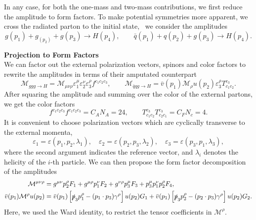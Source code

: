 In any case, for both the one-mass and two-mass contributions, we first reduce the amplitude to form factors. To make potential symmetries more apparent, we cross the radiated parton to the initial state, \ie\ we consider the amplitudes
\begin{equation}
g(p_1) + g_(p_2) + g(p_3) \longrightarrow H(p_4), \qquad \bar{q}(p_1) + q(p_2) + g(p_3) \longrightarrow H(p_4).
\end{equation}

\textbf{Projection to Form Factors}\\
We can factor out the external polarization vectors, spinors and color factors to rewrite the amplitudes in terms of their amputated counterpart
\begin{equation}
\mathcal{M}_{ggg \rightarrow H} = \mathcal{M}_{\mu \nu \rho} \varepsilon_1^\mu \varepsilon_2^\nu \varepsilon_3^\rho f^{c_1 c_2 c_3}, \qquad \mathcal{M}_{\bar{q} q g \rightarrow H} = \bar{v}(p_1) \mathcal{M}_{\rho} u(p_2) \varepsilon_3^\rho T^{c_3}_{c_1 c_2}.
\end{equation}
After squaring the amplitude and summing over the color of the external partons, we get the color factors
\begin{equation}
f^{c_1 c_2 c_3} f^{c_1 c_2 c_3} = C_A N_A = 24, \qquad T^{c_3}_{c_1 c_2} T^{c_{3}}_{c_2 c_1} = C_F N_c = 4.
\end{equation}
It is convenient to choose polarization vectors which are cyclically transverse to the external momenta, \ie\
\begin{equation}
\varepsilon_1 = \varepsilon (p_1, p_2, \lambda_1), \quad \varepsilon_2 = \varepsilon (p_2, p_3, \lambda_2), \quad \varepsilon_3 = \varepsilon (p_3, p_1, \lambda_3),
\end{equation}
where the second argument indicates the reference vector, and $\lambda_i$ denotes the helicity of the $i$-th particle. We can then propose the form factor decomposition of the amplitudes
\begin{equation}
\begin{split}
\mathcal{M}^{\mu \nu \rho} &= g^{\mu \nu} p_2^\rho F_1 + g^{\mu \rho} p_1^\nu F_2 + g^{\nu \rho} p_3^\mu F_3 + p_3^\mu p_1^\nu p_2^\rho F_4, \\
\bar{v}(p_1) \mathcal{M}^{\rho} u(p_2) &= \bar{v}(p_1)\left[ \slashed{p}_3 p_1^\rho - (p_1 \cdot p_3) \gamma^\rho \right] u(p_2) G_1 + \bar{v}(p_1) \left[ \slashed{p}_3 p_2^\rho - (p_2 \cdot p_3) \gamma^\rho \right] u(p_2) G_2.
\end{split}
\end{equation}
Here, we used the Ward identity, to restrict the tensor coefficients in $\mathcal{M}^\rho$.

